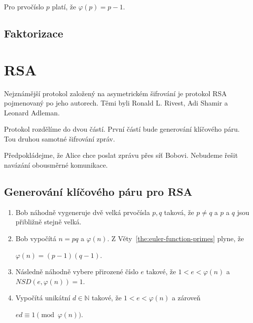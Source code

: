 \documentclass[
  program=infoi,
  biblatex,
  figures=false,
  glossaries,
  index
]{kidiplom}
\begin{document}
    \begin{theorem}\label{the:euler-function-primes}
        Pro prvočíslo $p$ platí, že $\varphi(p) = p-1$.
    \end{theorem}


    \subsection{Faktorizace}




\section{RSA}\label{sec:RSA}


    

    Nejznámější protokol založený na asymetrickém šifrování je protokol RSA pojmenovaný po jeho autorech.
    Těmi byli Ronald L. Rivest, Adi Shamir a Leonard Adleman.

    \medskip

    Protokol rozdělíme do dvou částí. První částí bude generování klíčového páru.
    Tou druhou samotné šifrování zpráv.

    \medskip

    Předpokládejme, že Alice chce poslat zprávu přes síť Bobovi.
    Nebudeme řešit navázání obousměrné komunikace.


    \subsection{Generování klíčového páru pro RSA}

        \begin{enumerate}
            \item 
                Bob náhodně vygeneruje dvě velká prvočísla $p,q$ taková, že $p \neq q$ a $p$ a $q$ jsou přibližně stejně velká.
            \item
                Bob vypočítá $n=pq$ a $\varphi(n)$. Z Věty~\ref{the:euler-function-primes} plyne, že
                
                \begin{center}
                    $\varphi(n) = (p-1)(q-1)$.
                \end{center}
            \item
                Následně náhodně vybere přirozené číslo $e$ takové, že $1 < e < \varphi(n)$ a $NSD(e, \varphi(n)) = 1$.
            \item
                Vypočítá unikátní $d \in \mathbb{N}$ takové, že $1 < e < \varphi(n)$ a zároveň

                \begin{center}
                    $ed \equiv 1 \pmod{\varphi(n)}$.
                \end{center}
        \end{enumerate}
\end{document}
